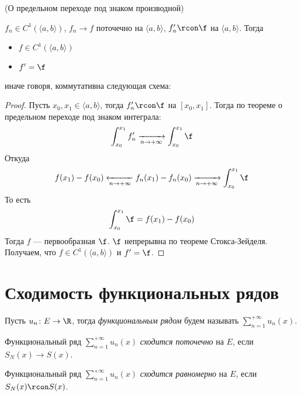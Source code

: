 \begin{theorem}(О предельном переходе под знаком производной)

    $f_n \in C^1(\langle a, b \rangle)$, $f_n \to f$ поточечно на $\langle a, b
    \rangle$, $f'_n \rcon \f$ на $\langle a, b \rangle$. Тогда
    \begin{itemize}
        \item $f \in C^1(\langle a, b \rangle)$
        \item $f' = \f$
    \end{itemize}
    иначе говоря, коммутативна следующая схема:

\end{theorem}
\begin{proof}
    Пусть $x_0, x_1 \in \langle a, b \rangle$, тогда $f'_n \rcon \f$
    на $[x_0, x_1]$. Тогда по теореме о предельном переходе под
    знаком интеграла:
\[
    \int_{x_0}^{x_1}{f'_n} \xrightarrow[n \to +\infty]{}
    \int_{x_0}^{x_1}{\f}
\]
    Откуда
\[
    f(x_1) - f(x_0) \xleftarrow[n \to +\infty]{} f_n(x_1) - f_n(x_0)
    \xrightarrow[n \to +\infty]{} \int_{x_0}^{x_1}{\f}
\]
    То есть
\[
    \int_{x_0}^{x_1}{\f} = f(x_1) - f(x_0)
\]
    Тогда $f$ --- первообразная $\f$. $\f$ непрерывна по теореме
    Стокса-Зейделя. Получаем, что $f \in C^1(\langle a, b \rangle)$ и $f' = \f$.
\end{proof}

\newpage
\section{Сходимость функциональных рядов}

\begin{definition}
    Пусть $u_n \colon E \to \R$, тогда \textit{функциональным рядом} будем
    называть $\displaystyle \sum_{n = 1}^{+\infty}{u_n(x)}$.
\end{definition}

\begin{definition}
    Функциональный ряд $\displaystyle \sum_{n = 1}^{+\infty}{u_n(x)}$
    \textit{сходится поточечно} на $E$, если \\ $S_N(x) \to S(x)$.
\end{definition}

\begin{definition}
    Функциональный ряд $\displaystyle \sum_{n = 1}^{+\infty}{u_n(x)}$
    \textit{сходится равномерно} на $E$, если \\ $S_N(x) \rcon S(x)$.
\end{definition}

